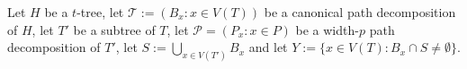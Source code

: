 \documentclass[kpfonts]{patmorin}
\begin{document}
\begin{lem}
    Let $H$ be a $t$-tree, let $\mathcal{T}:=(B_x:x\in V(T))$ be a canonical path decomposition of $H$,  let $T'$ be a subtree of $T$, let $\mathcal{P}=(P_x:x\in P)$ be a width-$p$ path decomposition of $T'$, let $S:=\bigcup_{x\in V(T')} B_x$  and let $Y:=\{x\in V(T): B_x\cap S\neq\emptyset\}$.
\end{lem}





\end{document}
